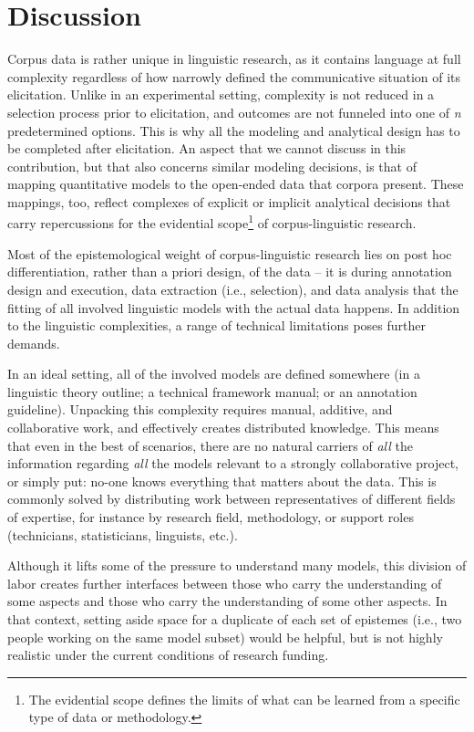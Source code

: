 \documentclass[output=paper,colorlinks,citecolor=brown]{langscibook}
\begin{document}
\section{Discussion}

Corpus data is rather unique in linguistic research, as it contains language at full complexity regardless of how narrowly defined the communicative situation of its elicitation. Unlike in an experimental setting, complexity is not reduced in a selection process prior to elicitation, and outcomes are not funneled into one of \textit{n} predetermined options. This is why all the modeling and analytical design has to be completed after elicitation. An aspect that we cannot discuss in this contribution, but that also concerns similar modeling decisions, is that of mapping quantitative models to the open-ended data that corpora present. These mappings, too, reflect complexes of explicit or implicit analytical decisions that carry repercussions for the evidential scope\footnote{The evidential scope \parencite[see e.~g.][]{leonelli2009locality,leonelli2019} defines the limits of what can be learned from a specific type of data or methodology.} of corpus-linguistic research.

Most of the epistemological weight of corpus-linguistic research lies on post hoc differentiation, rather than a priori design, of the data  -- it is during annotation design and execution, data extraction (i.e., selection), and data analysis that the fitting of all involved linguistic models with the actual data happens. In addition to the linguistic complexities, a range of technical limitations poses further demands.

In an ideal setting, all of the involved models are defined somewhere (in a linguistic theory outline; a technical framework manual; or an annotation guideline). Unpacking this complexity requires manual, additive, and collaborative work, and effectively creates distributed knowledge. This means that even in the best of scenarios, there are no natural carriers of \textit{all} the information regarding \textit{all} the models relevant to a strongly collaborative project, or simply put: no-one knows everything that matters about the data. This is commonly solved by distributing work between representatives of different fields of expertise, for instance by research field, methodology, or support roles (technicians, statisticians, linguists, etc.).

Although it lifts some of the pressure to understand many models, this division of labor creates further interfaces between those who carry the understanding of some aspects and those who carry the understanding of some other aspects. In that context, setting aside space for a duplicate of each set of epistemes (i.e., two people working on the same model subset) would be helpful, but is not highly realistic under the current conditions of research funding.
\end{document}
